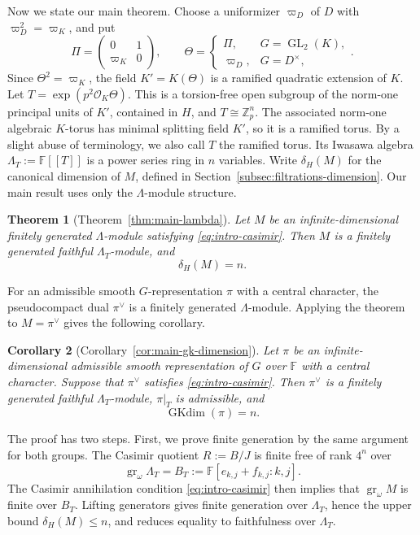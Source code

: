 \documentclass[11pt]{article}
\numberwithin{equation}{section}
\newtheorem{theorem}{Theorem}[section]
\newtheorem{corollary}[theorem]{Corollary}
\theoremstyle{definition}
\theoremstyle{remark}
\newcommand{\F}{\mathbb F}
\newcommand{\Z}{\mathbb Z}
\newcommand{\cO}{\mathcal O}
\DeclareMathOperator{\GL}{GL}
\DeclareMathOperator{\gr}{gr}
\DeclareMathOperator{\GKdim}{GKdim}
\begin{document}
Now we state our main theorem. Choose a uniformizer $\varpi_D$ of $D$ with
$\varpi_D^2=\varpi_K$, and put
\[
 \Pi=\begin{pmatrix}0&1\\\varpi_K&0\end{pmatrix},\qquad
 \Theta=\begin{cases}
   \Pi,&G=\GL_2(K),\\
   \varpi_D,&G=D^\times,
 \end{cases}.
\]
Since $\Theta^2=\varpi_K$, the field $K'=K(\Theta)$ is a ramified
quadratic extension of $K$. Let $T=\exp(p^2\cO_K\Theta)$. This is a
torsion-free open subgroup of the norm-one principal units of
$K'$, contained in $H$, and $T\cong\Z_p^n$.
The associated norm-one algebraic $K$-torus has minimal splitting
field $K'$, so it is a ramified torus. By a slight abuse of terminology,
we also call $T$ the
ramified torus. 
Its Iwasawa algebra $\Lambda_T:=\F[[T]]$ is a power series ring
in $n$ variables.
Write $\delta_H(M)$ for the canonical dimension of $M$,
defined in Section~\ref{subsec:filtrations-dimension}.
Our main result uses only the $\Lambda$-module structure.

\begin{theorem}[Theorem~\ref{thm:main-lambda}]
\label{thm:intro-main}
Let $M$ be an infinite-dimensional finitely generated
$\Lambda$-module satisfying \eqref{eq:intro-casimir}. Then $M$ is
a finitely generated faithful $\Lambda_T$-module, and
\[
 \delta_H(M)=n.
\]
\end{theorem}

For an admissible smooth $G$-representation $\pi$ with a central
character, the pseudocompact dual $\pi^\vee$ is a finitely generated
$\Lambda$-module. Applying the theorem to $M=\pi^\vee$
gives the following corollary.

\begin{corollary}[Corollary~\ref{cor:main-gk-dimension}]
\label{cor:intro-gk-dimension}
Let $\pi$ be an infinite-dimensional admissible smooth
representation of $G$ over $\F$ with a central character. Suppose
that $\pi^\vee$ satisfies \eqref{eq:intro-casimir}.
Then $\pi^\vee$ is a finitely generated faithful $\Lambda_T$-module,
$\pi|_T$ is admissible, and
\[
 \GKdim(\pi)=n.
\]
\end{corollary}

The proof has two steps. First, we prove finite generation by the
same argument for both groups. The Casimir quotient $R:=B/J$ is
finite free of rank $4^n$ over
\[
 \gr_\omega \Lambda_T=B_T:=\F[e_{k,j}+f_{k,j}:k,j].
\]
The Casimir annihilation condition \eqref{eq:intro-casimir} then implies that
$\gr_\omega M$ is finite over $B_T$. Lifting generators gives
finite generation over $\Lambda_T$, hence the upper bound
$\delta_H(M)\leq n$, and reduces equality to faithfulness over $\Lambda_T$.
\end{document}
